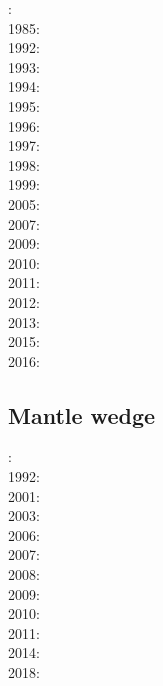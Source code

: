 : \cite{yusb82}\cite{chri82}\\
1985: \cite{chyu85}\\
1992: \cite{zhyh92}\\
1993: \cite{tasg93}\cite{best93}\cite{kief93}\\
1994: \cite{vayv94}\cite{zhgu94b}\\
1995: \cite{zhyu95}\cite{chri95}\cite{scta95}\\
1996: \cite{pelt96}\\
1997: \cite{mifo97}\\
1998: \cite{cava98}\\
1999: \cite{sigh99}\\
2005: \cite{hett05}\\
2007: \cite{pazw07}\cite{mofm07}\\
2009: \cite{natd09}\\
2010: \cite{kayy10}\\
2011: \cite{java11}\cite{faff11}\cite{nata11}\\
2012: \cite{tack12}\cite{sato12}\\
2013: \cite{fakc13}\cite{taab13}\\
2015: \cite{basn15}\\
2016: \cite{tiro16}\cite{beci16}

\subsection*{Mantle wedge} 

: \cite{tosl78}\\
1992: \cite{dast92}\\
2001: \cite{bigu01}\cite{haki01}\\
2003: \cite{vank03}\\
2006: \cite{gogc06}\cite{gecy06}\\
2007: \cite{gogc07}\cite{knvk07}\cite{lohd07}\\
2008: \cite{knva08}\cite{cage08}\\
2009: \cite{leki09}\cite{heaa09}\\
2010: \cite{roms10}\cite{hogz10}\\
2011: \cite{zhgh11}\\
2014: \cite{ledg14}\cite{mabv14}\\
2018: \cite{pltv18}

